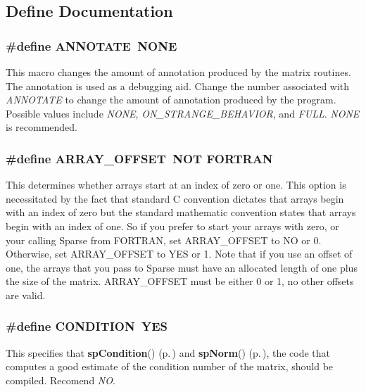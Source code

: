 \subsection{Define Documentation}
\subsubsection{\setlength{\rightskip}{0pt plus 5cm}\#define ANNOTATE\ NONE}\label{spConfig_8h_a45}


This macro changes the amount of annotation produced by the matrix routines. The annotation is used as a debugging aid. Change the number associated with {\em ANNOTATE} to change the amount of annotation produced by the program. Possible values include {\em NONE}, {\em ON\_\-STRANGE\_\-BEHAVIOR}, and {\em FULL}. {\em NONE} is recommended. 
\subsubsection{\setlength{\rightskip}{0pt plus 5cm}\#define ARRAY\_\-OFFSET\ NOT FORTRAN}\label{spConfig_8h_a5}


This determines whether arrays start at an index of zero or one. This option is necessitated by the fact that standard C convention dictates that arrays begin with an index of zero but the standard mathematic convention states that arrays begin with an index of one. So if you prefer to start your arrays with zero, or your calling Sparse from FORTRAN, set ARRAY\_\-OFFSET to NO or 0. Otherwise, set ARRAY\_\-OFFSET to YES or 1. Note that if you use an offset of one, the arrays that you pass to Sparse must have an allocated length of one plus the size of the matrix. ARRAY\_\-OFFSET must be either 0 or 1, no other offsets are valid. 
\subsubsection{\setlength{\rightskip}{0pt plus 5cm}\#define CONDITION\ YES}\label{spConfig_8h_a17}


This specifies that {\bf sp\-Condition}() {\rm (p.\,\pageref{spUtils_8c_a20})} and {\bf sp\-Norm}() {\rm (p.\,\pageref{spUtils_8c_a21})}, the code that computes a good estimate of the condition number of the matrix, should be compiled. Recomend {\em NO}. 
